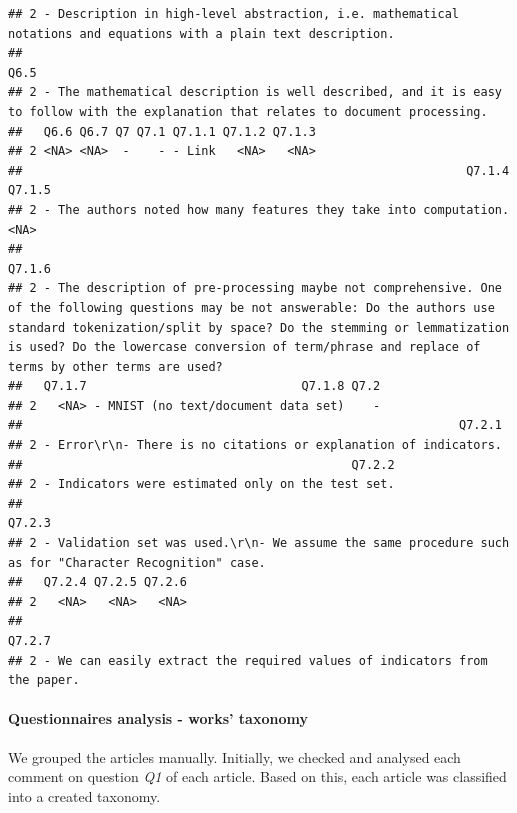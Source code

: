 \documentclass[
]{article}
\begin{document}
\begin{verbatim}
## 2 - Description in high-level abstraction, i.e. mathematical notations and equations with a plain text description.
##                                                                                                                                   Q6.5
## 2 - The mathematical description is well described, and it is easy to follow with the explanation that relates to document processing.
##   Q6.6 Q6.7 Q7 Q7.1 Q7.1.1 Q7.1.2 Q7.1.3
## 2 <NA> <NA>  -    - - Link   <NA>   <NA>
##                                                              Q7.1.4 Q7.1.5
## 2 - The authors noted how many features they take into computation.   <NA>
##                                                                                                                                                                                                                                                                                                           Q7.1.6
## 2 - The description of pre-processing maybe not comprehensive. One of the following questions may be not answerable: Do the authors use standard tokenization/split by space? Do the stemming or lemmatization is used? Do the lowercase conversion of term/phrase and replace of terms by other terms are used?
##   Q7.1.7                              Q7.1.8 Q7.2
## 2   <NA> - MNIST (no text/document data set)    -
##                                                             Q7.2.1
## 2 - Error\r\n- There is no citations or explanation of indicators.
##                                              Q7.2.2
## 2 - Indicators were estimated only on the test set.
##                                                                                                   Q7.2.3
## 2 - Validation set was used.\r\n- We assume the same procedure such as for "Character Recognition" case.
##   Q7.2.4 Q7.2.5 Q7.2.6
## 2   <NA>   <NA>   <NA>
##                                                                      Q7.2.7
## 2 - We can easily extract the required values of indicators from the paper.
\end{verbatim}

\hypertarget{questionnaires-analysis---works-taxonomy}{%
\paragraph{Questionnaires analysis - works' taxonomy}\label{questionnaires-analysis---works-taxonomy}}

We grouped the articles manually. Initially, we checked and analysed each comment on question \emph{Q1} of each article. Based on this, each article was classified into a created taxonomy.
\end{document}
